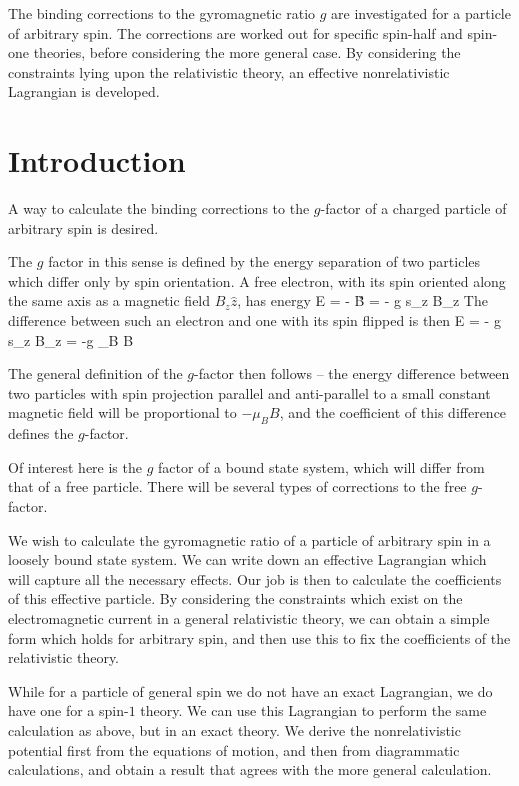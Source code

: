 The binding corrections to the gyromagnetic ratio $g$ are investigated for a particle of arbitrary spin.  The corrections are worked out for specific spin-half and spin-one theories, before considering the more general case.  By considering the constraints lying upon the relativistic theory, an effective nonrelativistic Lagrangian is developed.

\chapter{Introduction}
A way to calculate the binding corrections to the $g$-factor of a charged particle of arbitrary spin is desired.

The $g$ factor in this sense is defined by the energy separation of two particles which differ only by spin orientation.  A free electron, with its spin oriented along the same axis as a magnetic field $B_z\hat{z}$, has energy
\beq
 E = - \gv{\mu} \cdot \v{B} = - g s_z B_z
\eeq
The difference between such an electron and one with its spin flipped is then
\beq
	\delta E = - g s_z B_z = -g \mu_B B
\eeq

The general definition of the $g$-factor then follows -- the energy difference between two particles with spin projection parallel and anti-parallel to a small constant magnetic field will be proportional to $ - \mu_B B$, and the coefficient of this difference defines the $g$-factor.

Of interest here is the $g$ factor of a bound state system, which will differ from that of a free particle.  There will be several types of corrections to the free $g$-factor.

We wish to calculate the gyromagnetic ratio of a particle of arbitrary spin in a loosely bound state system.  We can write down an effective Lagrangian which will capture all the necessary effects.  Our job is then to calculate the coefficients of this effective particle.  By considering the constraints which exist on the electromagnetic current in a general relativistic theory, we can obtain a simple form which holds for arbitrary spin, and then use this to fix the coefficients of the relativistic theory.

While for a particle of general spin we do not have an exact Lagrangian, we do have one for a spin-$1$ theory.  We can use this Lagrangian to perform the same calculation as above, but in an exact theory.  We derive the nonrelativistic potential first from the equations of motion, and then from diagrammatic calculations, and obtain a result that agrees with the more general calculation.  
